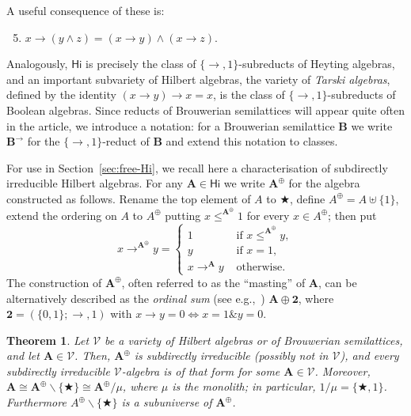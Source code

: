 \documentclass{amsart}
\newtheorem{theorem}{Theorem}[section]
\newcommand{\alg}[1]{\mathbf{#1}}
\newcommand{\var}[1]{\mathsf{#1}}
\def\ra{\rightarrow}
\def\op{\bigstar}
\begin{document}
A useful consequence of these is:
\begin{enumerate}[label={(B\arabic*)}]
\setcounter{enumi}{4}
\item $x\ra (y\wedge z) = (x\ra y)\wedge(x\ra z)$.
\end{enumerate}  
Analogously, $\var{Hi}$ is precisely the class of $\{\ra,1\}$-subreducts of Heyting
algebras, and an important subvariety of Hilbert algebras, the variety of
\emph{Tarski algebras}, defined by the identity
$(x\ra y)\ra x = x$, is the class of 
$\{\ra,1\}$-subreducts of Boolean algebras. Since reducts
of Brouwerian semilattices will appear quite often in the article,
we introduce a notation: for a Brouwerian semilattice $\alg{B}$ we write
$\alg{B}^\ra$ for the $\{\ra,1\}$-reduct of $\alg{B}$ and extend this notation
to classes. 

For use in Section~\ref{sec:free-Hi}, we recall here a
characterisation of subdirectly irreducible Hilbert algebras.
For any $\alg{A}\in\var{Hi}$ we write 
$\alg{A}^\oplus$ for the algebra constructed as follows.
Rename the top element of $A$ to $\op$, define
$A^\oplus = A\uplus \{1\}$, extend the ordering on $A$ to $A^\oplus$
putting $x \leq^{\alg{A}^\oplus} 1$ for every $x\in A^\oplus$; then put
$$
x \ra^{\alg{A}^\oplus} y =\begin{cases}
  1 & \text{ if } x\leq^{\alg{A}^\oplus} y,\\
  y & \text{ if } x = 1,\\
  x\ra^{\alg{A}} y & \text{ otherwise.}
\end{cases}
$$
The construction of $\alg{A}^\oplus$, often referred to as the ``masting'' of
$\alg{A}$, can be alternatively described as the \emph{ordinal
  sum} (see e.g.,~\cite{BF00})
$\alg{A}\oplus\alg{2}$, where 
$\alg{2} = (\{0,1\}; \ra, 1)$ with $x\ra y = 0 \iff x = 1 \mathbin{\&} y = 0$.


\begin{theorem}\label{thm:Hi-si}
Let $\mathcal{V}$ be a variety of Hilbert algebras or of Brouwerian semilattices,
and let $\alg{A}\in\mathcal{V}$.  
Then, $\alg{A}^\oplus$ is subdirectly
irreducible (possibly not in $\mathcal{V}$),
and every subdirectly irreducible $\mathcal{V}$-algebra is of that form
for some $\alg{A}\in\mathcal{V}$.
Moreover, $\alg{A}\cong\alg{A}^\oplus\smallsetminus\{\op\}\cong 
\alg{A}^\oplus/\mu$, where $\mu$ is the monolith;
in particular, $1/\mu = \{\op, 1\}$.
Furthermore $A^\oplus\smallsetminus\{\op\}$ is a subuniverse of
$\alg{A}^\oplus$. 
\end{theorem}  
\end{document}
